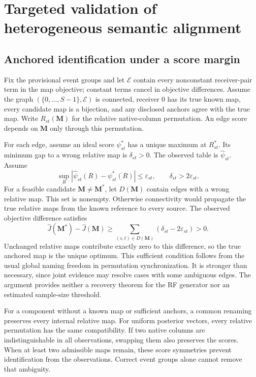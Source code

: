 \section{Targeted validation of heterogeneous semantic alignment}\label{sec:supp_deep}
\subsection{Anchored identification under a score margin}
Fix the provisional event groups and let $\mathcal E$ contain every nonconstant receiver-pair term in the map objective; constant terms cancel in objective differences. Assume the graph $(\{0,\ldots,S-1\},\mathcal E)$ is connected, receiver 0 has its true known map, every candidate map is a bijection, and any disclosed anchors agree with the true map. Write $R_{st}(\mathbf M)$ for the relative native-column permutation. An edge score depends on $\mathbf M$ only through this permutation.

For each edge, assume an ideal score $\psi^*_{st}$ has a unique maximum at $R^*_{st}$. Its minimum gap to a wrong relative map is $\delta_{st}>0$. The observed table is $\widehat\psi_{st}$. Assume
\[
 \sup_R\left|\widehat\psi_{st}(R)-\psi^*_{st}(R)\right|\leq\varepsilon_{st},
 \qquad \delta_{st}>2\varepsilon_{st}.
\]
For a feasible candidate $\mathbf M\ne\mathbf M^*$, let $D(\mathbf M)$ contain edges with a wrong relative map. This set is nonempty. Otherwise connectivity would propagate the true relative maps from the known reference to every source. The observed objective difference satisfies
\[
 \widehat J(\mathbf M^*)-\widehat J(\mathbf M)
 \geq\sum_{(s,t)\in D(\mathbf M)}
       (\delta_{st}-2\varepsilon_{st})>0.
\]
Unchanged relative maps contribute exactly zero to this difference, so the true anchored map is the unique optimum. This sufficient condition follows from the usual global naming freedom in permutation synchronization. It is stronger than necessary, since joint evidence may resolve cases with some ambiguous edges. The argument provides neither a recovery theorem for the RF generator nor an estimated sample-size threshold.

For a component without a known map or sufficient anchors, a common renaming preserves every internal relative map. For uniform posterior vectors, every relative permutation has the same compatibility. If two native columns are indistinguishable in all observations, swapping them also preserves the scores. When at least two admissible maps remain, these score symmetries prevent identification from the observations. Correct event groups alone cannot remove that ambiguity.

